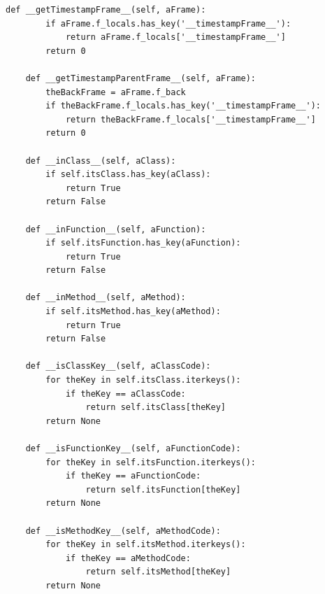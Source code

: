 \documentclass[12pt,legalpaper]{report}
\begin{document}
\begin{singlespace}
\begin{lstlisting}[style=Python]
    def __getTimestampFrame__(self, aFrame):
        if aFrame.f_locals.has_key('__timestampFrame__'):
            return aFrame.f_locals['__timestampFrame__']
        return 0

    def __getTimestampParentFrame__(self, aFrame):
        theBackFrame = aFrame.f_back 
        if theBackFrame.f_locals.has_key('__timestampFrame__'):
            return theBackFrame.f_locals['__timestampFrame__']
        return 0

    def __inClass__(self, aClass):
        if self.itsClass.has_key(aClass):
            return True
        return False

    def __inFunction__(self, aFunction):
        if self.itsFunction.has_key(aFunction):
            return True
        return False

    def __inMethod__(self, aMethod):
        if self.itsMethod.has_key(aMethod):
            return True
        return False

    def __isClassKey__(self, aClassCode):
        for theKey in self.itsClass.iterkeys():
            if theKey == aClassCode:
                return self.itsClass[theKey]
        return None

    def __isFunctionKey__(self, aFunctionCode):
        for theKey in self.itsFunction.iterkeys():
            if theKey == aFunctionCode:
                return self.itsFunction[theKey]
        return None

    def __isMethodKey__(self, aMethodCode):
        for theKey in self.itsMethod.iterkeys():
            if theKey == aMethodCode:
                return self.itsMethod[theKey]
        return None


\end{lstlisting}
\end{singlespace}
\end{document}
